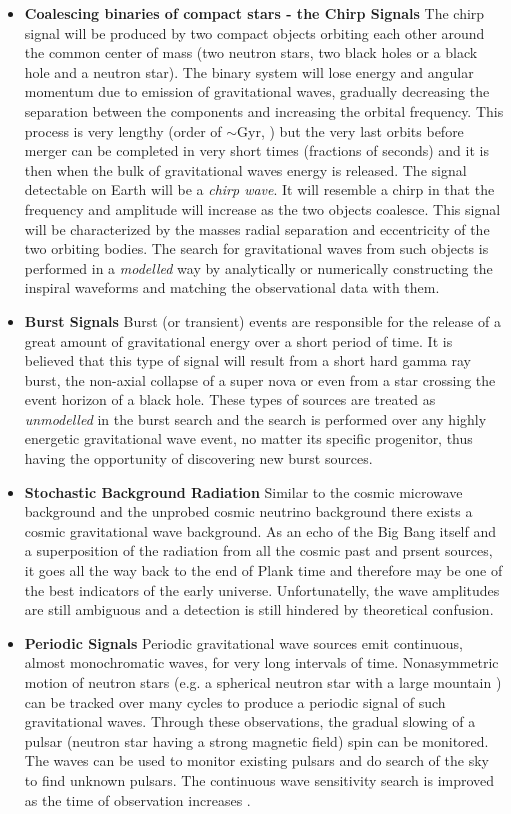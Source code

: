 \documentclass[epsf]{article}
\begin{document}
\begin{itemize}
 \item{{\bf Coalescing binaries of compact stars - the Chirp Signals}} The chirp signal will be produced by two compact objects orbiting each other around the common center of mass (two neutron stars, two black holes or a black hole and a neutron star). The binary system will lose energy and angular momentum due to emission of gravitational waves, gradually decreasing the separation between the components and increasing the orbital frequency. This process is very lengthy (order of $\sim$Gyr, \cite{abbott2006,abbott2007}) but the very last orbits before merger can be completed in very short times (fractions of seconds) and it is then when the bulk of gravitational waves energy is released. The signal detectable on Earth will be a {\it chirp wave}. It will resemble a chirp in that the frequency and amplitude will increase as the two objects coalesce. This signal will be characterized by the masses radial separation and eccentricity of the two orbiting bodies. The search for gravitational waves from such objects is performed in a {\it modelled} way by analytically or numerically constructing the inspiral waveforms and matching the observational data with them.
 \item{{\bf Burst Signals}} Burst (or transient) events are responsible for the release of a great amount of gravitational energy over a short period of time. It is believed that this type of signal will result from a short hard gamma ray burst, the non-axial collapse of a super nova or even from a star crossing the event horizon of a black hole. These types of sources are treated as {\it unmodelled} in the burst search and the search is performed over any highly energetic gravitational wave event, no matter its specific progenitor, thus having the opportunity of discovering new burst sources.
 \item{{\bf Stochastic Background Radiation}} Similar to the cosmic microwave background and the unprobed cosmic neutrino background there exists a cosmic gravitational wave background. As an echo of the Big Bang itself and a superposition of the radiation from all the cosmic past and prsent sources, it goes all the way back to the end of Plank time and therefore may be one of the best indicators of the early universe. Unfortunatelly, the wave amplitudes are still ambiguous and a detection is still hindered by theoretical confusion.
 \item{{\bf Periodic Signals}} Periodic gravitational wave sources emit continuous, almost monochromatic waves, for very long intervals of time. Nonasymmetric motion of neutron stars (e.g. a spherical neutron star with a large mountain \cite{abbott2006,abbott2007}) can be tracked over many cycles to produce a periodic signal of such gravitational waves. Through these observations, the gradual slowing of a pulsar (neutron star having a strong magnetic field) spin can be monitored. The waves can be used to monitor existing pulsars and do search of the sky to find unknown pulsars. The continuous wave sensitivity search is improved as the time of observation increases \cite{ian}.   
\end{itemize}
\end{document}
